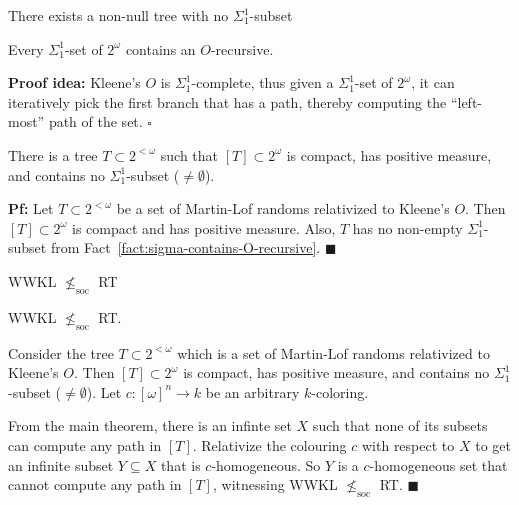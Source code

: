\begin{frame}{There exists a non-null tree with no $\Sigma_1^1$-subset}
  \begin{fact}
    \label{fact:sigma-contains-O-recursive}
    Every $\Sigma_1^1$-set of $2^\omega$ contains an $O$-recursive.
  \end{fact}
  \textbf{Proof idea:} Kleene's $O$ is $\Sigma_1^1$-complete, thus given a 
  $\Sigma_1^1$-set of $2^\omega$, it can iteratively pick the first branch
  that has a path, thereby computing the ``left-most'' path of the set.
  $\square$

  \vspace{1em}
  \begin{thm}
    There is a tree $T\subset2^{<\omega}$ such that $[T]\subset
    2^\omega$ is compact, has positive measure, and contains no
    $\Sigma_1^1$-subset ($\neq\emptyset$).
  \end{thm}
  \textbf{Pf:} Let $T\subset2^{<\omega}$ be a set of Martin-Lof randoms
  relativized to Kleene's $O$. Then $[T]\subset 2^\omega$ is compact and
  has positive measure. Also, $T$ has no non-empty $\Sigma_1^1$-subset from
  Fact~\ref{fact:sigma-contains-O-recursive}. $\blacksquare$
\end{frame}

\begin{frame}{WWKL $\nleq_{\text{soc}}$ RT}
  \begin{theorem}
    WWKL $\nleq_{\text{soc}}$ RT.
  \end{theorem}

  Consider the tree $T\subset2^{<\omega}$ which is a set of Martin-Lof
  randoms relativized to Kleene's $O$. Then $[T]\subset 2^\omega$ is
  compact, has positive measure, and contains no $\Sigma_1^1$-subset
  ($\neq\emptyset$). Let $c:[\omega]^n\rightarrow k$ be an arbitrary
  $k$-coloring.
  
  \vspace{1em}
  From the main theorem, there is an infinte set $X$ such that none of its
  subsets can compute any path in $[T]$. Relativize the colouring $c$ with
  respect to $X$ to get an infinite subset $Y\subseteq X$ that is
  $c$-homogeneous. So $Y$ is a $c$-homogeneous set that cannot compute
  any path in $[T]$, witnessing WWKL $\nleq_{\text{soc}}$ RT.
  $\blacksquare$
\end{frame}
